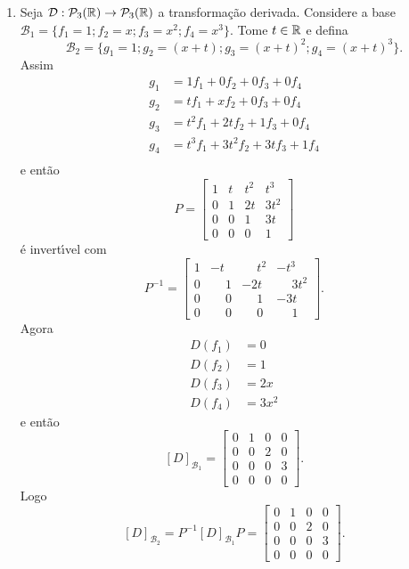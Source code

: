 \begin{exemplos}
\begin{enumerate}[label={\arabic*})]
    \item Seja $\mathcal{D} : \mathcal{P}_3(\mathbb{R}) \to \mathcal{P}_3(\mathbb{R})$ a transforma\c{c}\~ao derivada. Considere a base $\mathcal{B}_1 = \{f_1 = 1; f_2 = x; f_3 = x^2; f_4 = x^3\}$. Tome $t \in \mathbb{R}$ e defina
    \[
      \mathcal{B}_2 = \{g_1 = 1; g_2 = (x + t); g_3 = (x + t)^2; g_4 = (x + t)^3\}.
    \]
    Assim
    \begin{align*}
      g_1 &= 1f_1 + 0f_2 + 0f_3 + 0f_4\\
      g_2 &= tf_1 + xf_2 + 0f_3 + 0f_4\\
      g_3 &= t^2f_1 + 2tf_2 + 1f_3 + 0f_4\\
      g_4 &= t^3f_1 + 3t^2f_2 + 3tf_3 + 1f_4\\
    \end{align*}
    e ent\~ao
    \[
      P = \begin{bmatrix}
        1 & t & t^2 & t^3\\
        0 & 1 & 2t & 3t^2\\
        0 & 0 & 1 & 3t\\
        0 & 0 & 0 & 1
      \end{bmatrix}
    \]
    \'e invert{\'\i}vel com
    \[
      P^{-1} = \begin{bmatrix}
        1 & -t & \phantom{-}t^2 & -t^3\\
        0 & \phantom{-}1 & -2t & \phantom{-}3t^2\\
        0 & \phantom{-}0 & \phantom{-}1 & -3t\\
        0 & \phantom{-}0 & \phantom{-}0 & \phantom{-}1
      \end{bmatrix}.
    \]
    Agora
    \begin{align*}
      D(f_1) &= 0\\
      D(f_2) &= 1\\
      D(f_3) &= 2x\\
      D(f_4) &= 3x^2
    \end{align*}
    e ent\~ao
    \[
      [D]_{\mathcal{B}_1} = \begin{bmatrix}
        0 & 1 & 0 & 0\\
        0 & 0 & 2 & 0\\
        0 & 0 & 0 & 3\\
        0 & 0 & 0 & 0
      \end{bmatrix}.
    \]
    Logo
    \[
      [D]_{\mathcal{B}_2} = P^{-1}[D]_{\mathcal{B}_1}P = \begin{bmatrix}
        0 & 1 & 0 & 0\\
        0 & 0 & 2 & 0\\
        0 & 0 & 0 & 3\\
        0 & 0 & 0 & 0
      \end{bmatrix}.
    \]
  \end{enumerate}
\end{exemplos}
